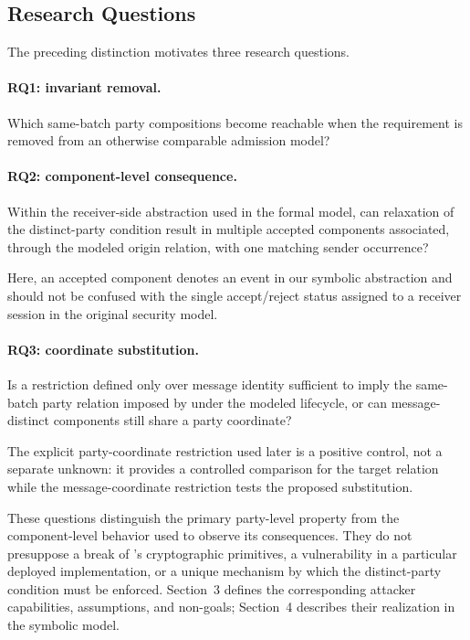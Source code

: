 \subsection{Research Questions}

The preceding distinction motivates three research questions.

\paragraph{RQ1: invariant removal.}
Which same-batch party compositions become reachable when the
\distinctparty requirement is removed from an otherwise comparable admission
model?

\paragraph{RQ2: component-level consequence.}
Within the receiver-side abstraction used in the formal model, can relaxation
of the distinct-party condition result in multiple accepted components
associated, through the modeled origin relation, with one matching sender
occurrence?

Here, an accepted component denotes an event in our symbolic abstraction and
should not be confused with the single accept/reject status assigned to a
receiver session in the original \kwaay security model.

\paragraph{RQ3: coordinate substitution.}
Is a restriction defined only over message identity sufficient to imply the
same-batch party relation imposed by \distinctparty under the modeled
lifecycle, or can message-distinct components still share a party coordinate?

The explicit party-coordinate restriction used later is a positive control,
not a separate unknown: it provides a controlled comparison for the target
relation while the message-coordinate restriction tests the proposed
substitution.

These questions distinguish the primary party-level property from the
component-level behavior used to observe its consequences. They do not
presuppose a break of \kwaay's cryptographic primitives, a vulnerability in a
particular deployed implementation, or a unique mechanism by which the
distinct-party condition must be enforced. Section~3 defines the corresponding
attacker capabilities, assumptions, and non-goals; Section~4 describes their
realization in the symbolic model.
